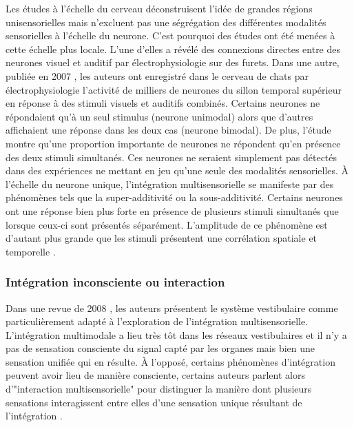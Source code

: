 Les études à l'échelle du cerveau déconstruisent l'idée de grandes régions unisensorielles mais n'excluent pas une ségrégation des différentes modalités sensorielles à l'échelle du neurone. C'est pourquoi des études ont été menées à cette échelle plus locale. L'une d'elles a révélé des connexions directes entre des neurones visuel et auditif \cite{bizley_physiological_2007} par électrophysiologie sur des furets. Dans une autre, publiée en 2007 \cite{allman_multisensory_2007}, les auteurs ont enregistré dans le cerveau de chats par électrophysiologie l'activité de milliers de neurones du sillon temporal supérieur en réponse à des stimuli visuels et auditifs combinés. Certains neurones ne répondaient qu'à un seul stimulus (neurone unimodal) alors que d'autres affichaient une réponse dans les deux cas (neurone bimodal). De plus, l'étude montre qu'une proportion importante de neurones ne répondent qu'en présence des deux stimuli simultanés. Ces neurones ne seraient simplement pas détectés dans des expériences ne mettant en jeu qu'une seule des modalités sensorielles. À l'échelle du neurone unique, l'intégration multisensorielle se manifeste par des phénomènes tels que la super-additivité ou la sous-additivité. Certains neurones ont une réponse bien plus forte en présence de plusieurs stimuli simultanés que lorsque ceux-ci sont présentés séparément. L'amplitude de ce phénomène est d'autant plus grande que les stimuli présentent une corrélation spatiale et temporelle \cite{stein_multisensory_2008}. 


\subsubsection{Intégration inconsciente ou interaction}\label{integration_interaction}

Dans une revue de 2008 \cite{angelaki_vestibular_2008}, les auteurs présentent le système vestibulaire comme particulièrement adapté à l'exploration de l'intégration multisensorielle. L'intégration multimodale a lieu très tôt dans les réseaux vestibulaires et il n'y a pas de sensation consciente du signal capté par les organes mais bien une sensation unifiée qui en résulte.
À l'opposé, certains phénomènes d'intégration peuvent avoir lieu de manière consciente, certains auteurs parlent alors d'"interaction multisensorielle" pour distinguer la manière dont plusieurs sensations interagissent entre elles d'une sensation unique résultant de l'intégration \cite{driver_multisensory_2008}. 

